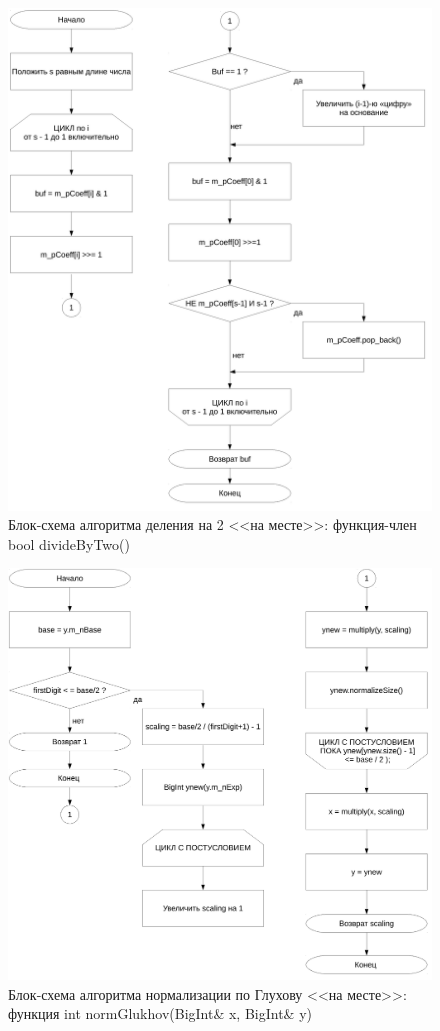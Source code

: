 \documentclass[a4paper,12pt]{article} %
\begin{document}
\begin{figure}[ht]
	\includegraphics[width=\textwidth]{lr3_divideByTwo.pdf}
	\caption{Блок-схема алгоритма деления на 2 <<на месте>>: функция-член bool divideByTwo()}
\end{figure}

\begin{figure}[ht]
	\includegraphics[width=\textwidth]{lr3_normGlukhov.pdf}
	\caption{Блок-схема алгоритма нормализации по Глухову <<на месте>>: функция int normGlukhov(BigInt\& x, BigInt\& y)}
\end{figure}
\end{document}
